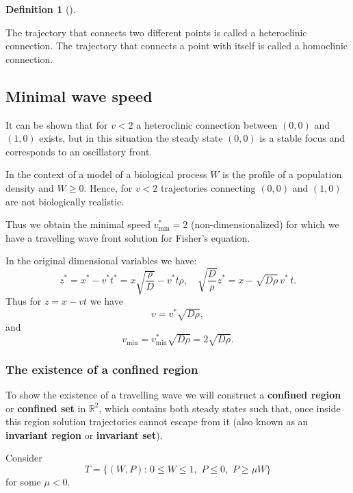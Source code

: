 \documentclass[
  letterpaper,
  DIV=11,
  numbers=noendperiod]{scrreprt}
\theoremstyle{definition}
\newtheorem{definition}{Definition}[chapter]
\theoremstyle{plain}
\theoremstyle{plain}
\theoremstyle{remark}
\begin{document}
\begin{definition}[]\protect\hypertarget{def-line}{}\label{def-line}

The trajectory that connects two different points is called a
heteroclinic connection. The trajectory that connects a point with
itself is called a homoclinic connection.

\end{definition}

\hypertarget{minimal-wave-speed}{%
\subsection{Minimal wave speed}\label{minimal-wave-speed}}

It can be shown that for \(v<2\) a heteroclinic connection between
\((0,0)\) and \((1,0)\) exists, but in this situation the steady state
\((0,0)\) is a stable focus and corresponds to an oscillatory front.

In the context of a model of a biological process \(W\) is the profile
of a population density and \(W\geq 0\). Hence, for \(v<2\) trajectories
connecting \((0,0)\) and \((1,0)\) are not biologically realistic.

Thus we obtain the minimal speed \(v^\ast_\text{min}=2\)
(non-dimensionalized) for which we have a travelling wave front solution
for Fisher's equation.

In the original dimensional variables we have: \[
z^\ast= x^\ast - v^\ast t^\ast = x \sqrt{ \frac \rho D} - v^\ast t \rho , \quad 
\sqrt{ \frac D \rho } z^\ast= x  - \sqrt{D \rho}  \, v^\ast\,  t.
\] Thus for \(z = x - vt\) we have \[ 
v=  v^\ast \sqrt{D \rho},
\] and \[
v_{\text{min}}=  v^\ast_{\text{min}} \sqrt{D \rho} = 2  \sqrt{D \rho}.
\]

\hypertarget{the-existence-of-a-confined-region}{%
\subsubsection{The existence of a confined
region}\label{the-existence-of-a-confined-region}}

To show the existence of a travelling wave we will construct a
\textbf{confined region} or \textbf{confined set} in \(\mathbb{R}^2\),
which contains both steady states such that, once inside this region
solution trajectories cannot escape from it (also known as an
\textbf{invariant region} or \textbf{invariant set}).

Consider \[
T= \{ (W,P) : \, 0 \leq W \leq 1,\, \, P \leq 0, \, \,  P \geq \mu W \} 
\] for some \(\mu <0\).
\end{document}
